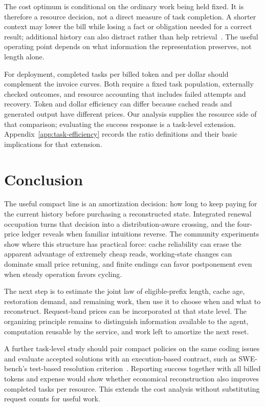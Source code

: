 \documentclass[sigconf,screen,nonacm]{acmart}
\begin{document}
The cost optimum is conditional on the ordinary work being held fixed.
It is therefore a resource decision, not a direct measure of task completion.
A shorter context may lower the bill while losing a fact or obligation needed
for a correct result; additional history can also distract rather than help
retrieval~\cite{lostmiddle}. The useful operating point depends on what
information the representation preserves, not length alone.

For deployment, completed tasks per billed token and per dollar should
complement the invoice curves. Both require a fixed task population,
externally checked outcomes, and resource accounting that includes failed
attempts and recovery. Token and dollar efficiency can differ because cached
reads and generated output have different prices. Our analysis supplies the
resource side of that comparison; evaluating the success response is a
task-level extension. Appendix~\ref{app:task-efficiency} records the ratio
definitions and their basic implications for that extension.

\section{Conclusion}
\label{sec:conclusion}

The useful compact line is an amortization decision: how long to keep paying
for the current history before purchasing a reconstructed state. Integrated
renewal occupation turns that decision into a distribution-aware crossing,
and the four-price ledger reveals when familiar intuitions reverse. The
community experiments show where this structure has practical force: cache
reliability can erase the apparent advantage of extremely cheap reads,
working-state changes can dominate small price retuning, and finite endings
can favor postponement even when steady operation favors cycling.

The next step is to estimate the joint law of eligible-prefix length, cache
age, restoration demand, and remaining work, then use it to choose when and
what to reconstruct. Request-band prices can be incorporated at that state
level. The organizing principle remains to distinguish information available
to the agent, computation reusable by the service, and work left to amortize
the next reset.

A further task-level study should pair compact policies on the same coding
issues and evaluate accepted solutions with an execution-based contract,
such as SWE-bench's test-based resolution criterion~\cite{swebench}.
Reporting success together with all billed tokens and expense would show
whether economical reconstruction also improves completed tasks per resource.
This extends the cost analysis without substituting request counts for
useful work.
\end{document}
